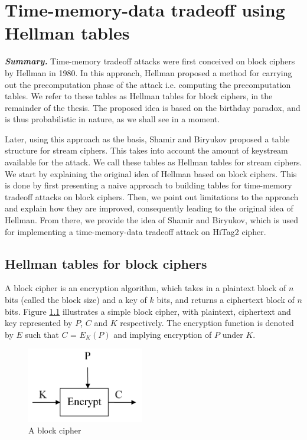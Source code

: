 \chapter{Time-memory-data tradeoff using Hellman tables}
\label{chapter:tmdto-hellman}


\footnotesize
\indent \textbf{\textit{Summary.}} Time-memory tradeoff attacks were first conceived on block ciphers by Hellman in 1980. In this approach, Hellman proposed a method for carrying out the precomputation phase of the attack i.e. computing the precomputation tables. We refer to these tables as Hellman tables for block ciphers, in the remainder of the thesis. The proposed idea is based on the birthday paradox, and is thus probabilistic in nature, as we shall see in a moment. 

Later, using this approach as the basis, Shamir and Biryukov proposed a table structure for stream ciphers. This takes into account the amount of keystream available for the attack. We call these tables as Hellman tables for stream ciphers. We start by explaining the original idea of Hellman based on block ciphers. This is done by first presenting a naive approach to building tables for time-memory tradeoff attacks on block ciphers. Then, we point out limitations to the approach and explain how they are improved, consequently leading to the original idea of Hellman. From there, we provide the idea of Shamir and Biryukov, which is used for implementing a time-memory-data tradeoff attack on HiTag2 cipher.

\normalsize
\section{Hellman tables for block ciphers}

A block cipher is an encryption algorithm, which takes in a plaintext block of $n$ bits (called the block size) and a key of $k$ bits, and returns a ciphertext block of $n$ bits. Figure \ref{fig:block-cipher} illustrates a simple block cipher, with plaintext, ciphertext and key represented by $P$, $C$ and $K$ respectively. The encryption function is denoted by $E$ such that $C$ = $E_K(P)$ and implying encryption of $P$ under $K$.

\begin{figure}[ht!]
	\centering
		\includegraphics[width=2in]{./figures/block-cipher.PNG}
	\caption{A block cipher}	
	\label{fig:block-cipher}
\end{figure}

